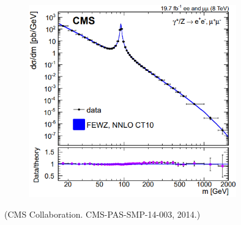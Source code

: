 \documentclass[xcolor=dvipsnames]{beamer}
\begin{document}
\begin{frame}
\begin{minipage}{0.54\textwidth}
\begin{figure}[H]
			\includegraphics[width=0.8\textwidth]{DYeeCS.PNG}
		\end{figure}
		\vspace{-0.4cm}
		\tiny\centering(CMS Collaboration. CMS-PAS-SMP-14-003, 2014.)
	\end{minipage}
\end{frame}
\end{document}
